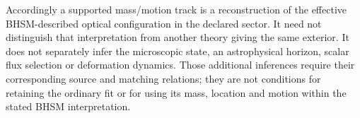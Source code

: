 Accordingly a supported mass/motion track is a reconstruction of the
effective BHSM-described optical configuration in the declared sector.
It need not distinguish that interpretation from another theory giving
the same exterior. It does not separately infer the microscopic state,
an astrophysical horizon, scalar flux selection or deformation dynamics.
Those additional inferences require their corresponding source and
matching relations; they are not conditions for retaining the ordinary
fit or for using its mass, location and motion within the stated BHSM
interpretation.
